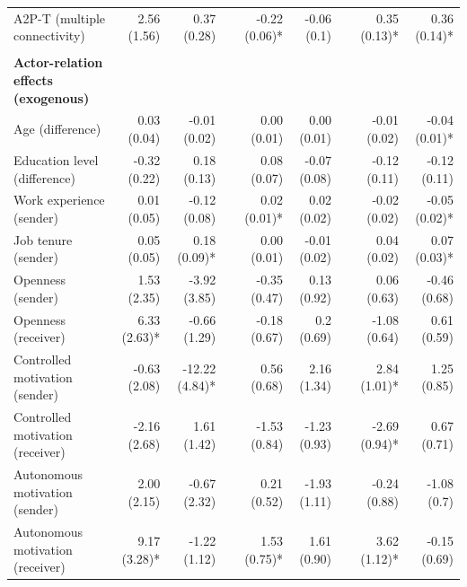 \begin{table}
{\begin{threeparttable}
\begin{tabular}{@{}lrrcrrcrr@{}}
A2P-T (multiple connectivity) & 2.56 (1.56)\phantom{*} & 0.37 (0.28)\phantom{*} &  & -0.22 (0.06)* & -0.06 (0.1)\phantom{*} &  & 0.35 (0.13)* & 0.36 (0.14)* \\ \\
\textbf{Actor-relation effects (exogenous)} & \multicolumn{1}{l}{} & \multicolumn{1}{l}{} &  & \multicolumn{1}{l}{} & \multicolumn{1}{l}{} &  & \multicolumn{1}{l}{} & \multicolumn{1}{l}{} \\
Age (difference) & 0.03 (0.04)\phantom{*} & -0.01 (0.02)\phantom{*} &  & 0.00 (0.01)\phantom{*} & 0.00 (0.01)\phantom{*} &  & -0.01 (0.02)\phantom{*} & -0.04 (0.01)* \\
Education level (difference) & -0.32 (0.22)\phantom{*} & 0.18 (0.13)\phantom{*} &  & 0.08 (0.07)\phantom{*} & -0.07 (0.08)\phantom{*} &  & -0.12 (0.11)\phantom{*} & -0.12 (0.11)\phantom{*} \\
Work experience (sender) & 0.01 (0.05)\phantom{*} & -0.12 (0.08)\phantom{*} &  & 0.02 (0.01)* & 0.02 (0.02)\phantom{*} &  & -0.02 (0.02)\phantom{*} & -0.05 (0.02)* \\
Job tenure (sender) & 0.05 (0.05)\phantom{*} & 0.18 (0.09)* &  & 0.00 (0.01)\phantom{*} & -0.01 (0.02)\phantom{*} &  & 0.04 (0.02)\phantom{*} & 0.07 (0.03)* \\
Openness (sender) & 1.53 (2.35)\phantom{*} & -3.92 (3.85)\phantom{*} &  & -0.35 (0.47)\phantom{*} & 0.13 (0.92)\phantom{*} &  & 0.06 (0.63)\phantom{*} & -0.46 (0.68)\phantom{*} \\
Openness (receiver) & 6.33 (2.63)* & -0.66 (1.29)\phantom{*} &  & -0.18 (0.67)\phantom{*} & 0.2 (0.69)\phantom{*} &  & -1.08 (0.64)\phantom{*} & 0.61 (0.59)\phantom{*} \\
Controlled motivation (sender) & -0.63 (2.08)\phantom{*} & -12.22 (4.84)* &  & 0.56 (0.68)\phantom{*} & 2.16 (1.34)\phantom{*} &  & 2.84 (1.01)* & 1.25 (0.85)\phantom{*} \\
Controlled motivation (receiver) & -2.16 (2.68)\phantom{*} & 1.61 (1.42)\phantom{*} &  & -1.53 (0.84)\phantom{*} & -1.23 (0.93)\phantom{*} &  & -2.69 (0.94)* & 0.67 (0.71)\phantom{*} \\
Autonomous motivation (sender) & 2.00 (2.15)\phantom{*} & -0.67 (2.32)\phantom{*} &  & 0.21 (0.52)\phantom{*} & -1.93 (1.11)\phantom{*} &  & -0.24 (0.88)\phantom{*} & -1.08 (0.7)\phantom{*} \\
Autonomous motivation (receiver) & 9.17 (3.28)* & -1.22 (1.12)\phantom{*} &  & 1.53 (0.75)* & 1.61 (0.90)\phantom{*} &  & 3.62 (1.12)* & -0.15 (0.69)\phantom{*} \\

\end{tabular}
\end{threeparttable}}
\end{table}
